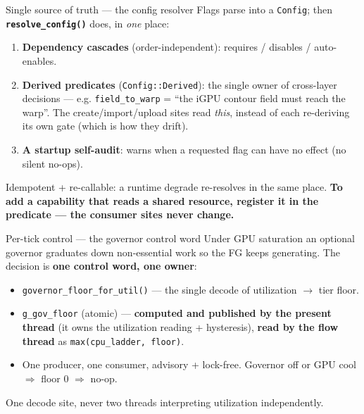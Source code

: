 \documentclass[aspectratio=169]{beamer}
\begin{document}
\begin{frame}{Single source of truth --- the config resolver}
Flags parse into a \texttt{Config}; then \textbf{\texttt{resolve\_config()}} does, in \emph{one} place:
\begin{enumerate}
  \item \textbf{Dependency cascades} (order-independent): requires / disables / auto-enables.
  \item \textbf{Derived predicates} (\texttt{Config::Derived}): the single owner of cross-layer decisions ---
        e.g. \texttt{field\_to\_warp} = ``the iGPU contour field must reach the warp''. The create/import/upload
        sites read \emph{this}, instead of each re-deriving its own gate (which is how they drift).
  \item \textbf{A startup self-audit}: warns when a requested flag can have no effect (no silent no-ops).
\end{enumerate}
\vfill
{\footnotesize Idempotent + re-callable: a runtime degrade re-resolves in the same place. \textbf{To add a
capability that reads a shared resource, register it in the predicate --- the consumer sites never change.}}
\end{frame}

\begin{frame}{Per-tick control --- the governor control word}
Under GPU saturation an optional governor graduates down non-essential work so the FG keeps generating.
The decision is \textbf{one control word, one owner}:
\begin{itemize}
  \item \texttt{governor\_floor\_for\_util()} --- the single decode of utilization $\to$ tier floor.
  \item \texttt{g\_gov\_floor} (atomic) --- \textbf{computed and published by the present thread} (it owns the
        utilization reading + hysteresis), \textbf{read by the flow thread} as \texttt{max(cpu\_ladder, floor)}.
  \item One producer, one consumer, advisory + lock-free. Governor off or GPU cool $\Rightarrow$ floor $0$ $\Rightarrow$ no-op.
\end{itemize}
\vfill
{\footnotesize One decode site, never two threads interpreting utilization independently.}
\end{frame}
\end{document}
